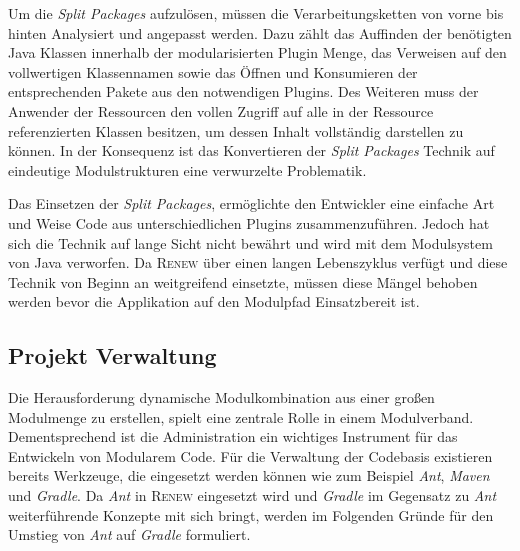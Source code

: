 		Um die \textit{Split Packages} aufzulösen, müssen die Verarbeitungsketten von vorne bis hinten Analysiert und angepasst werden. Dazu zählt das Auffinden der benötigten Java Klassen innerhalb der modularisierten Plugin Menge, das Verweisen auf den vollwertigen Klassennamen sowie das Öffnen und Konsumieren der entsprechenden Pakete aus den notwendigen Plugins. Des Weiteren muss der Anwender der Ressourcen den vollen Zugriff auf alle in der Ressource referenzierten Klassen besitzen, um dessen Inhalt vollständig darstellen zu können. In der Konsequenz ist das Konvertieren der \textit{Split Packages} Technik auf eindeutige Modulstrukturen eine verwurzelte Problematik. \bigbreak

		Das Einsetzen der \textit{Split Packages}, ermöglichte den Entwickler eine einfache Art und Weise Code aus unterschiedlichen Plugins zusammenzuführen. Jedoch hat sich die Technik auf lange Sicht nicht bewährt und wird mit dem Modulsystem von Java verworfen. Da \textsc{Renew} über einen langen Lebenszyklus verfügt und diese Technik von Beginn an weitgreifend einsetzte, müssen diese Mängel behoben werden bevor die Applikation auf den Modulpfad Einsatzbereit ist. 

	\subsection{Projekt Verwaltung} \label{sub:projekt_verwaltung} %
		Die Herausforderung dynamische Modulkombination aus einer großen Modulmenge zu erstellen, spielt eine zentrale Rolle in einem Modulverband. Dementsprechend ist die Administration ein wichtiges Instrument für das Entwickeln von Modularem Code.\newline
		Für die Verwaltung der Codebasis existieren bereits Werkzeuge, die eingesetzt werden können wie zum Beispiel \textit{Ant}, \textit{Maven} und \textit{Gradle}. Da \textit{Ant} in \textsc{Renew} eingesetzt wird und \textit{Gradle} im Gegensatz zu \textit{Ant} weiterführende Konzepte mit sich bringt, werden im Folgenden Gründe für den Umstieg von \textit{Ant} auf \textit{Gradle} formuliert.
	
